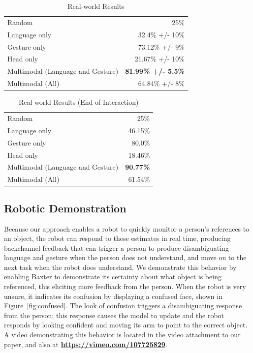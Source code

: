 \documentclass[letterpaper, 10 pt, conference]{ieeeconf}
\begin{document}
\begin{table}
\caption{Real-world Results\label{table:real_results}}
\centering
\begin{tabular}{lr}
\toprule
Random & 25\%\\
Language only &  32.4\% +/- 10\%\\
Gesture only  &  73.12\% +/- 9\%\\
Head only     &  21.67\% +/- 10\%\\
Multimodal (Language and Gesture) & {\bf 81.99\% +/- 5.5\%}\\
Multimodal (All) &  64.84\% +/- 8\%\\
\bottomrule
\end{tabular}
\end{table}
\begin{table}
\caption{Real-world Results (End of Interaction)\label{table:end_real}}
\centering
\begin{tabular}{lr}
\toprule
Random & 25\%\\
Language only &  46.15\%\\
Gesture only  &  80.0\%\\
Head only     & 18.46\%\\
Multimodal (Language and Gesture) & {\bf 90.77\%}\\
Multimodal (All) &  61.54\%\\
\bottomrule
\end{tabular}
\end{table}

\subsection{Robotic Demonstration}

Because our approach enables a robot to quickly monitor a person's
references to an object, the robot can respond to these estimates in
real time, producing backchannel feedback that can trigger a person to
produce disambiguating language and gesture when the person does not
understand, and move on to the next task when the robot does
understand.  We demonstrate this behavior by enabling Baxter to
demonstrate its certainty about what object is being referenced, this
eliciting more feedback from the person.  When the robot is very
unsure, it indicates its confusion by displaying a confused face,
shown in Figure~\ref{fig:confused}.  The look of confusion triggers a
disambiguating response from the person; this response causes the
model to update and the robot responds by looking confident and moving
its arm to point to the correct object.  A video demonstrating this
behavior is located in the video attachment to our paper, and also at
\href{https://vimeo.com/107725829}{\textbf{https://vimeo.com/107725829}}.
\end{document}

